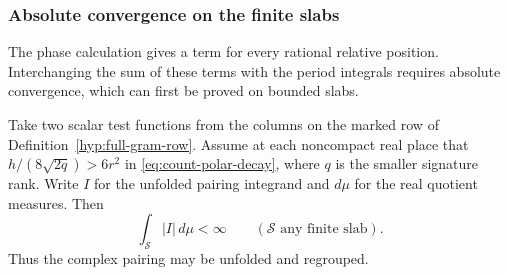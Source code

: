 \subsubsection{Absolute convergence on the finite slabs}

The phase calculation gives a term for every rational relative position. Interchanging the sum of these terms with the period integrals requires absolute convergence, which can first be proved on bounded slabs.

\begin{proposition}\label{prop:gram-absolute-slab}
Take two scalar test functions from the columns on the marked row of Definition~\ref{hyp:full-gram-row}.
Assume at each noncompact real place that
\(h/(8\sqrt{2q})>6r^2\) in \eqref{eq:count-polar-decay}, where
\(q\) is the smaller signature rank. Write \(I\) for the unfolded pairing integrand and \(d\mu\) for the real quotient measures. Then 
\[
 \int_{\mathcal S}|I|\,d\mu<\infty\qquad(\mathcal S\text{ any finite slab}).
\]
 Thus the complex pairing may be
unfolded and regrouped.
\end{proposition}

